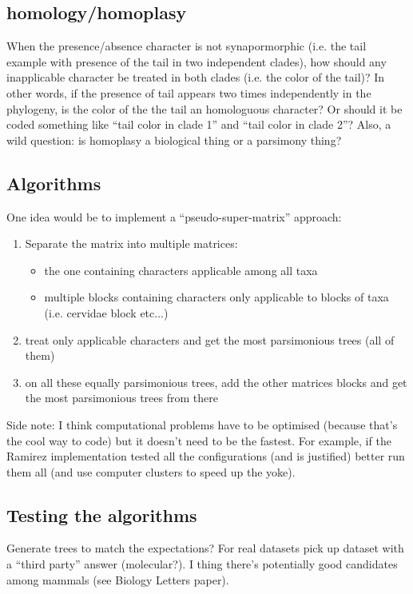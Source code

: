\documentclass[a4paper,11pt]{article}
\begin{document}
\subsection{homology/homoplasy} 
When the presence/absence character is not synapormorphic (i.e. the tail example with presence of the tail in two independent clades), how should any inapplicable character be treated in both clades (i.e. the color of the tail)?
In other words, if the presence of tail appears two times independently in the phylogeny, is the color of the the tail an homologuous character?
Or should it be coded something like ``tail color in clade 1'' and ``tail color in clade 2''?
Also, a wild question: is homoplasy a biological thing or a parsimony thing?

\subsection{Algorithms}
One idea would be to implement a ``pseudo-super-matrix'' approach:
\begin{enumerate}
\item Separate the matrix into multiple matrices:
\begin{itemize}
\item the one containing characters applicable among all taxa
\item multiple blocks containing characters only applicable to blocks of taxa (i.e. cervidae block etc...)
\end{itemize}
\item treat only applicable characters and get the most parsimonious trees (all of them)
\item on all these equally parsimonious trees, add the other matrices blocks and get the most parsimonious trees from there
\end{enumerate}

Side note: I think computational problems have to be optimised (because that's the cool way to code) but it doesn't need to be the fastest.
For example, if the Ramirez implementation tested all the configurations (and is justified) better run them all (and use computer clusters to speed up the yoke).

\subsection{Testing the algorithms}
Generate trees to match the expectations?
For real datasets pick up dataset with a ``third party'' answer (molecular?).
I thing there's potentially good candidates among mammals (see Biology Letters paper).
\end{document}
